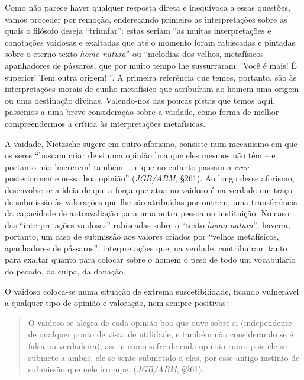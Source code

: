 \documentclass[
	12pt,				%
	openright,			%
	oneside,			%
	a4paper,			%
	english,			%
	french,				%
	spanish,			%
	brazil				%
	]{abntex2}
\begin{document}
Como não parece haver qualquer resposta direta e inequívoca a essas questões, vamos proceder por remoção, endereçando primeiro as interpretações sobre as quais o filósofo deseja “triunfar”: estas seriam “as muitas interpretações e conotações vaidosas e exaltadas que até o momento foram rabiscadas e pintadas sobre o eterno texto \textit{homo natura}” ou “melodias dos velhos, metafísicos apanhadores de pássaros, que por muito tempo lhe sussurraram: 'Você é mais! É superior! Tem outra origem!'”. A primeira referência que temos, portanto, são às interpretações morais de cunho metafísico que atribuíram ao homem uma origem ou uma destinação divinas. Valendo-nos das poucas pistas que temos aqui, passemos a uma breve consideração sobre a vaidade, como forma de melhor compreendermos a crítica às interpretações metafísicas.

	A vaidade, Nietzsche sugere em outro aforismo, consiste num mecanismo em que os seres “buscam criar de si uma opinião boa que eles mesmos não têm – e portanto não 'merecem' também –, e que no entanto passam a \textit{crer} posteriormente nessa boa opinião” (\textit{JGB/ABM}, §261). Ao longo desse aforismo, desenvolve-se a ideia de que a força que atua no vaidoso é na verdade um traço de submissão às valorações que lhe são atribuídas por outrem, uma transferência da capacidade de autoavaliação para uma outra pessoa ou instituição. No caso das “interpretações vaidosas” rabiscadas sobre o “texto \textit{homo natura}”, haveria, portanto, um caso de submissão aos valores criados por “velhos metafísicos, apanhadores de pássaros”, interpretações que, na verdade, contribuiram tanto para exaltar quanto para colocar sobre o homem o peso de todo um vocabulário do pecado, da culpa, da danação. 
	
	O vaidoso coloca-se numa situação de extrema suscetibilidade, ficando vulnerável a qualquer tipo de opinião e valoração, nem sempre positivas: 

\begin{quotation}
O vaidoso se alegra de cada opinião boa que ouve sobre si (independente de qualquer ponto de vista de utilidade, e também não considerando se é falsa ou verdadeira), assim como sofre de cada opinião ruim: pois ele se submete a ambas, ele se sente submetido a elas, por esse antigo instinto de submissão que nele irrompe. (\textit{JGB/ABM}, §261).
\end{quotation}
\end{document}
